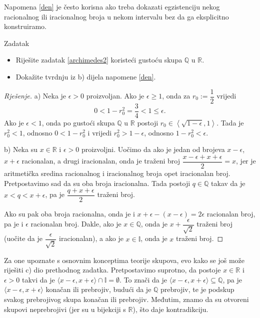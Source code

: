 Napomena \ref{den} je često korisna ako treba dokazati egzistenciju nekog racionalnog ili iracionalnog broja u nekom intervalu bez da ga eksplicitno konstruiramo.
\begin{exercise}{Zadatak} \textbf{}
\begin{itemize}
\item[a)] Riješite zadatak \ref{archimedes2} koristeći gustoću skupa $\mathbb{Q}$ u $\mathbb{R}$.
\item[b)] Dokažite tvrdnju iz b) dijela napomene \ref{den}. 
\end{itemize}
\end{exercise}
\begin{proof}[Rješenje]
a) Neka je $\epsilon>0$ proizvoljan. Ako je $\epsilon\geq 1$, onda za $r_0:=\dfrac{1}{2}$ vrijedi 
$$0<1-r_0^2=\dfrac{3}{4}<1\leq \epsilon.$$
Ako je $\epsilon<1$, onda po gustoći skupa $\mathbb{Q}$ u $\mathbb{R}$ postoji $r_0\in \left\langle \sqrt{1-\epsilon}, 1\right\rangle$. Tada je $r_0^2<1$, odnosno $0<1-r_0^2$ i vrijedi $r_0^2>1-\epsilon$, odnosno $1-r_0^2<\epsilon$.

b) Neka su \(x\in \mathbb{R}\) i \(\epsilon>0\) proizvoljni. Uočimo da ako je jedan od brojeva \(x-\epsilon\), \(x+\epsilon\) racionalan, a drugi iracionalan, onda je traženi broj \(\dfrac{x-\epsilon+x+\epsilon}{2}=x\), jer je aritmetička sredina racionalnog i iracionalnog broja opet iracionalan broj. Pretpostavimo sad da su oba broja iracionalna. Tada postoji \(q\in \mathbb{Q}\) takav da je \(x<q<x+\epsilon\), pa je \(\dfrac{q+x+\epsilon}{2}\) traženi broj.

Ako su pak oba broja racionalna, onda je i \(x+\epsilon-(x-\epsilon)=2\epsilon\) racionalan broj, pa je i \(\epsilon\) racionalan broj. Dakle, ako je \(x\in \mathbb{Q}\), onda je \(x+\dfrac{\epsilon}{\sqrt{2}}\) traženi broj (uočite da je \(\dfrac{\epsilon}{\sqrt{2}}\) iracionalan), a ako je \(x\in \mathbb{I}\), onda je \(x\) traženi broj.
\end{proof}
\begin{remark}
Za one upoznate s osnovnim konceptima teorije skupova, evo kako se još može riješiti c) dio prethodnog zadatka. Pretpostavimo suprotno, da postoje \(x\in \mathbb{R}\) i \(\epsilon>0\) takvi da je \(\langle x-\epsilon, x+\epsilon\rangle\cap \mathbb{I}=\emptyset\). To znači da je \(\langle x-\epsilon, x+\epsilon\rangle\subseteq \mathbb{Q}\), pa je \(\langle x-\epsilon, x+\epsilon\rangle\) konačan ili prebrojiv, budući da je \(\mathbb{Q}\) prebrojiv, te je podskup svakog prebrojivog skupa konačan ili prebrojiv. Međutim, znamo da su otvoreni skupovi neprebrojivi (jer su u bijekciji s \(\mathbb{R}\)), što daje kontradikciju.
\end{remark}
